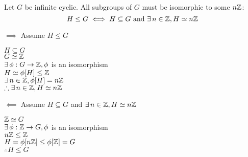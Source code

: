 \documentclass[letterpaper,12pt,fleqn]{article}
\newcommand{\p}{\phi}
\begin{document}
\begin{theorem}
  Let $G$ be infinite cyclic. All subgroups of $G$ must be isomorphic to
  some $n\mathbb{Z}$:
  \[H\le G\iff H\subseteq G\ \mbox{and}\ \exists\,n\in\Z,H\simeq n\Z\]
\end{theorem}
\newpage
\begin{theproof}
  \listbreak
  \begin{description}
    \item $\implies$ Assume $H\le G$
      
      $H\subseteq G$ \\
      $G\simeq\mathbb{Z}$ \\
      $\exists\,\phi:G\to\Z,\p$ is an isomorphism \\
      $H\simeq\p[H]\le\Z$ \\
      $\exists\,n\in\Z,\p[H]=n\Z$ \\
      $\therefore\exists\,n\in\mathbb{Z},H\simeq n\mathbb{Z}$

    \item $\impliedby$ Assume $H\subseteq G$ and $\exists\,n\in\mathbb{Z},H\simeq n\mathbb{Z}$

      $\mathbb{Z}\simeq G$ \\
      $\exists\,\phi:\Z\to G,\p$ is an isomorphism \\
      $n\mathbb{Z}\le\mathbb{Z}$ \\
      $H=\p[n\Z]\le\p[\Z]=G$ \\
      $\therefore H\le G$
  \end{description}
\end{theproof}
\end{document}
